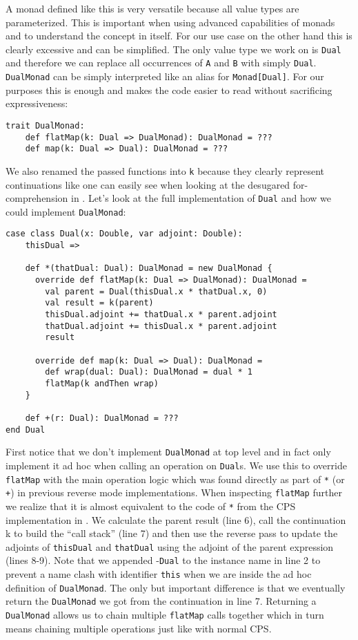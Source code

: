 A monad defined like this is very versatile because all value types are parameterized. This is important when using advanced capabilities of monads and to understand the concept in itself. For our use case on the other hand this is clearly excessive and can be simplified. The only value type we work on is \lstinline{Dual} and therefore we can replace all occurrences of \lstinline{A} and \lstinline{B} with simply \lstinline{Dual}. \lstinline{DualMonad} can be simply interpreted like an alias for \lstinline{Monad[Dual]}. For our purposes this is enough and makes the code easier to read without sacrificing expressiveness:
\begin{lstlisting}
trait DualMonad:
    def flatMap(k: Dual => DualMonad): DualMonad = ???
    def map(k: Dual => Dual): DualMonad = ???
\end{lstlisting}
We also renamed the passed functions into \lstinline{k} because they clearly represent continuations like one can easily see when looking at the desugared for-comprehension in . Let's look at the full implementation of \lstinline{Dual} and how we could implement \lstinline{DualMonad}:
\begin{lstlisting}
case class Dual(x: Double, var adjoint: Double):
    thisDual =>
  
    def *(thatDual: Dual): DualMonad = new DualMonad {
      override def flatMap(k: Dual => DualMonad): DualMonad =
        val parent = Dual(thisDual.x * thatDual.x, 0)
        val result = k(parent)
        thisDual.adjoint += thatDual.x * parent.adjoint
        thatDual.adjoint += thisDual.x * parent.adjoint
        result
  
      override def map(k: Dual => Dual): DualMonad =
        def wrap(dual: Dual): DualMonad = dual * 1
        flatMap(k andThen wrap)
    }

    def +(r: Dual): DualMonad = ???
end Dual
\end{lstlisting}
First notice that we don't implement \lstinline{DualMonad} at top level and in fact only implement it ad hoc when calling an operation on \lstinline{Dual}s. We use this to override \lstinline{flatMap} with the main operation logic which was found directly as part of \lstinline{*} (or \lstinline{+}) in previous reverse mode implementations. When inspecting \lstinline{flatMap} further we realize that it is almost equivalent to the code of \lstinline{*} from the CPS implementation in . We calculate the parent result (line 6), call the continuation k to build the ``call stack'' (line 7) and then use the reverse pass to update the adjoints of \lstinline{thisDual} and \lstinline{thatDual} using the adjoint of the parent expression (lines 8-9). Note that we appended -\lstinline{Dual} to the instance name in line 2 to prevent a name clash with identifier \lstinline{this} when we are inside the ad hoc definition of \lstinline{DualMonad}. The only but important difference is that we eventually return the \lstinline{DualMonad} we got from the continuation in line 7. Returning a \lstinline{DualMonad} allows us to chain multiple \lstinline{flatMap} calls together which in turn means chaining multiple operations just like with normal CPS.

